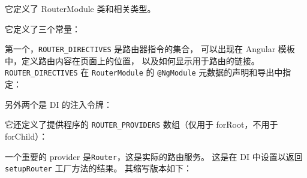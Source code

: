 
它定义了 RouterModule 类和相关类型。


它定义了三个常量：




第一个，\texttt{ROUTER\_DIRECTIVES} 是路由器指令的集合，
可以出现在 Angular 模板中，定义路由内容在页面上的位置，
以及如何显示用于路由的链接。
\texttt{ROUTER\_DIRECTIVES} 在 \texttt{RouterModule} 的 \texttt{@NgModule}
元数据的声明和导出中指定：




另外两个是 DI 的注入令牌：




它还定义了提供程序的 \texttt{ROUTER\_PROVIDERS} 数组（仅用于 forRoot，不用于 forChild）：




一个重要的 provider 是\texttt{Router}，这是实际的路由服务。
这是在 DI 中设置以返回 \texttt{setupRouter} 工厂方法的结果。
其缩写版本如下：




